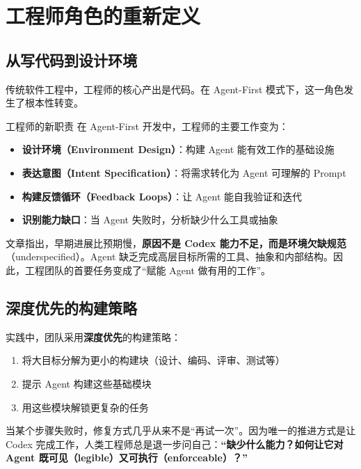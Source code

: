 \section{工程师角色的重新定义}

\subsection{从写代码到设计环境}

传统软件工程中，工程师的核心产出是代码。在 Agent-First 模式下，这一角色发生了根本性转变。

\begin{importantbox}{工程师的新职责}
在 Agent-First 开发中，工程师的主要工作变为：
\begin{itemize}[nosep]
  \item \textbf{设计环境（Environment Design）}：构建 Agent 能有效工作的基础设施
  \item \textbf{表达意图（Intent Specification）}：将需求转化为 Agent 可理解的 Prompt
  \item \textbf{构建反馈循环（Feedback Loops）}：让 Agent 能自我验证和迭代
  \item \textbf{识别能力缺口}：当 Agent 失败时，分析缺少什么工具或抽象
\end{itemize}
\end{importantbox}

文章指出，早期进展比预期慢，\textbf{原因不是 Codex 能力不足，而是环境欠缺规范}（underspecified）。Agent 缺乏完成高层目标所需的工具、抽象和内部结构。因此，工程团队的首要任务变成了``赋能 Agent 做有用的工作''。

\subsection{深度优先的构建策略}

实践中，团队采用\textbf{深度优先}的构建策略：

\begin{enumerate}[nosep]
  \item 将大目标分解为更小的构建块（设计、编码、评审、测试等）
  \item 提示 Agent 构建这些基础模块
  \item 用这些模块解锁更复杂的任务
\end{enumerate}

当某个步骤失败时，修复方式几乎从来不是``再试一次''。因为唯一的推进方式是让 Codex 完成工作，人类工程师总是退一步问自己：\textbf{``缺少什么能力？如何让它对 Agent 既可见（legible）又可执行（enforceable）？''}

